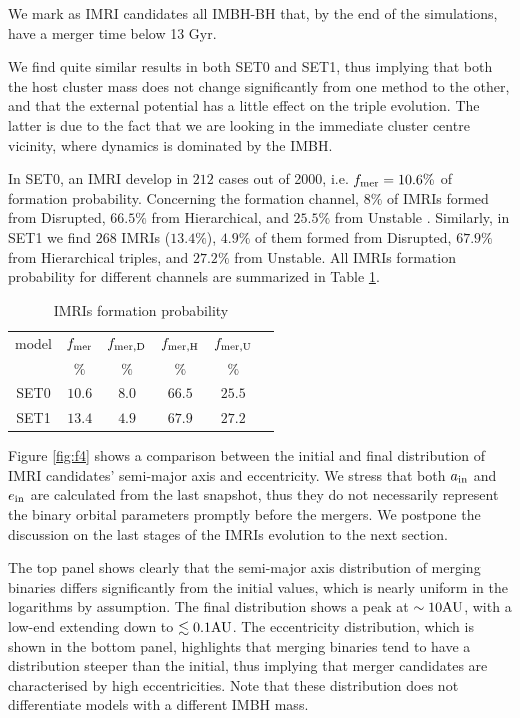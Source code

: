\documentclass[useAMS,usenatbib]{mn2e}
\newcommand{\au}{{\rm AU}}
\newcommand{\inn}{{\rm in}}
\begin{document}
We mark as IMRI candidates all IMBH-BH that, by the end of the simulations, have a merger time below 13 Gyr. 

We find quite similar results in both SET0 and SET1, thus implying that both the host cluster mass does not change significantly from one method to the other, and that the external potential has a little effect on the triple evolution. The latter is due to the fact that we are looking in the immediate cluster centre vicinity, where dynamics is dominated by the IMBH.

In SET0, an IMRI develop in $212$ cases out of 2000, i.e. $f_{\rm mer} = 10.6\%$ of formation probability. Concerning the formation channel, $8\%$ of IMRIs formed from Disrupted, $66.5\%$ from Hierarchical, and $25.5\%$ from Unstable . Similarly, in SET1 we find $268$ IMRIs ($13.4\%$), $4.9\%$ of them formed from Disrupted, $67.9\%$ from Hierarchical triples, and $27.2\%$ from Unstable. All IMRIs formation probability for different channels are summarized in Table \ref{tab:t3}.

\begin{table}
    \centering
    \caption{IMRIs formation probability}
    \begin{tabular}{cccccc}
        \hline
        \hline 
        model& $f_{\rm mer}$ & $f_{\rm mer,D}$ & $f_{\rm mer,H}$ & $f_{\rm mer,U}$\\
             & $\%$& $\%$& $\%$& $\%$\\
        \hline
        SET0 & $10.6$ & $8.0$ & $66.5$ & $25.5$ \\
        SET1 & $13.4$ & $4.9$ & $67.9$ & $27.2$ \\
        \hline
    \end{tabular}
    \label{tab:t3}
\end{table}


Figure \ref{fig:f4} shows a comparison between the initial and final distribution of IMRI candidates' semi-major axis and eccentricity. We stress that both $a_\inn$ and $e_\inn$ are calculated from the last snapshot, thus they do not necessarily represent the binary orbital parameters promptly before the mergers. We postpone the discussion on the last stages of the IMRIs evolution to the next section.

The top panel shows clearly that the semi-major axis distribution of merging binaries differs significantly from the initial values, which is nearly uniform in the logarithms by assumption. The final distribution shows a peak at $\sim 10\au$, with a low-end extending down to $\lesssim 0.1 \au$. The eccentricity distribution, which is shown in the bottom panel, highlights that merging binaries tend to have a distribution steeper than the initial, thus implying that merger candidates are characterised by high eccentricities. Note that these distribution does not differentiate models with a different IMBH mass. 
\end{document}
